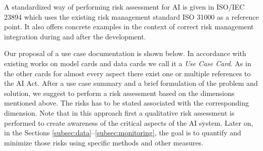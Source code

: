 A standardized way of performing risk assessment for AI is given in ISO/IEC 23894 which uses the existing risk management standard ISO 31000 as a reference point. It also offers concrete examples in the context of correct risk management integration during and after the development.


Our proposal of a use case documentation is shown below. In accordance with existing works on model cards \citep{Mitchell2019_ModelCards} and data cards \citep{Pushkarna2022_DataCards} we call it a \emph{Use Case Card}. As in the other cards for almost every aspect there exist one or multiple references to the AI Act. After a use case summary and a brief formulation of the problem and solution, we suggest to perform a risk assessment based on the dimensions mentioned above. The risks has to be stated associated with the corresponding dimension. Note that in this approach first a qualitative risk assessment is performed to create awareness of the critical aspects of the AI system. Later on, in the Sections \ref{subsec:data}--\ref{subsec:monitoring}, the goal is to quantify and minimize those risks using specific methods and other measures.

\newpage

